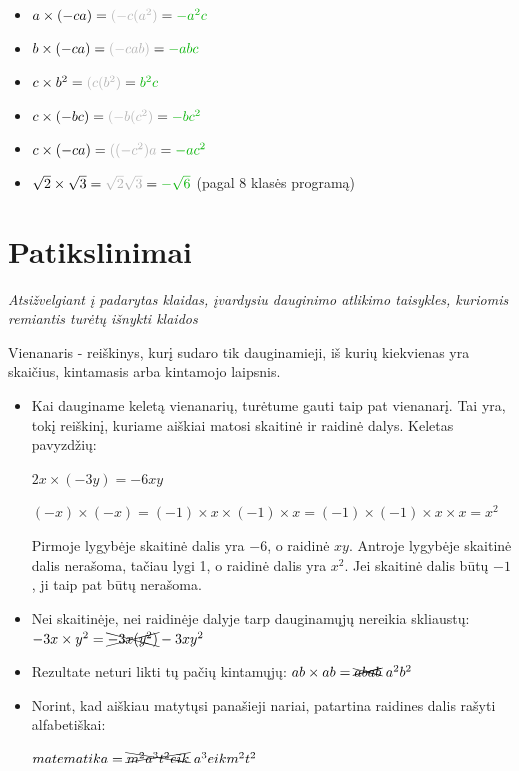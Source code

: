 \documentclass{article}
\begin{document}
\begin{minipage}[b]{0.3\linewidth}
    \begin{itemize}
        \item $a \times (-ca) = {\color{black!30}{(-c(a^2)}} = {\color{black!30!green}{-a^2c}}$
        \item $b \times (-ca) = {\color{black!30}{(-cab)}} = {\color{black!30!green}{-abc}}$
        \item $c \times b^2 = {\color{black!30}{(c(b^2)}} = {\color{black!30!green}{b^2c}}$
        \item $c \times (-bc) = {\color{black!30}{(-b(c^2)}} = {\color{black!30!green}{-bc^2}}$
        \item $c \times (-ca) = {\color{black!30}{((-c^2)a}} = {\color{black!30!green}{-ac^2}}$
        \item $\sqrt{2} \times \sqrt{3} =  {\color{black!30}{\sqrt{2}\sqrt{3}}} = {\color{black!30!green}{-\sqrt{6}}}$ (pagal 8 klasės programą)
    \end{itemize}
\end{minipage}
\section*{Patikslinimai}
\textit{Atsižvelgiant į padarytas klaidas, įvardysiu dauginimo atlikimo taisykles, kuriomis remiantis turėtų išnykti klaidos}
\newline
\begin{framed}
Vienanaris - reiškinys, kurį sudaro tik dauginamieji, iš kurių kiekvienas yra skaičius, kintamasis arba kintamojo laipsnis. 

\begin{itemize}
    \item Kai dauginame keletą vienanarių, turėtume gauti taip pat vienanarį. Tai yra, tokį reiškinį, kuriame aiškiai matosi skaitinė ir raidinė dalys. Keletas pavyzdžių:
    
    $2x\times (-3y) = -6xy$
    
    $(-x)\times(-x) = (-1) \times x \times (-1)\times x=(-1)\times (-1)\times x \times x = x^2$
    
    Pirmoje lygybėje skaitinė dalis yra $-6$, o raidinė $xy$. Antroje lygybėje skaitinė dalis nerašoma, tačiau lygi 1, o raidinė dalis yra $x^2$. Jei skaitinė dalis būtų $-1$, ji taip pat būtų nerašoma.
    \item Nei skaitinėje, nei raidinėje dalyje tarp dauginamųjų nereikia skliaustų: $-3x \times y^2 = \bcancel{\cancel{-3x(y^2)}}-3xy^2$
    \item Rezultate neturi likti tų pačių kintamųjų:
    $ab\times ab = \bcancel{\cancel{abab}}\text{ }a^2b^2$
    \item Norint, kad aiškiau matytųsi panašieji nariai, patartina raidines dalis rašyti alfabetiškai:
    
    $matematika = \bcancel{\cancel{m^2a^3t^2eik}}\text{ } a^3eikm^2t^2$
\end{itemize}
\end{framed}
\end{document}
